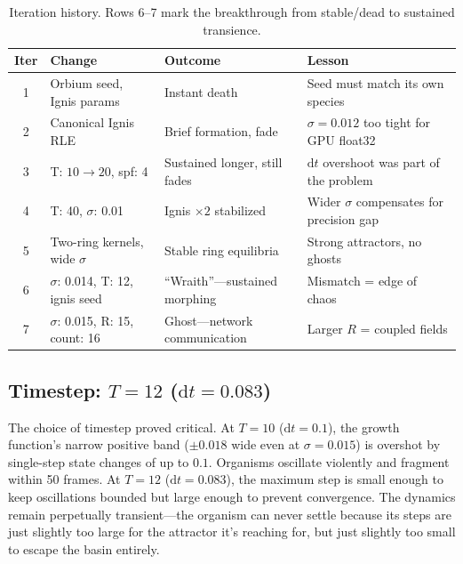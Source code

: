 \documentclass[11pt,a4paper]{article}
\begin{document}
\begin{table}[h]
\centering
\small
\setlength{\tabcolsep}{6pt}
\renewcommand{\arraystretch}{1.2}
\begin{tabularx}{\linewidth}{@{}c l X X@{}}
\toprule
\textbf{Iter} & \textbf{Change} & \textbf{Outcome} & \textbf{Lesson} \\
\midrule
1 & Orbium seed, Ignis params       & Instant death                & Seed must match its own species \\
2 & Canonical Ignis RLE             & Brief formation, fade        & $\sigma{=}0.012$ too tight for GPU float32 \\
3 & T: $10\to 20$, spf: 4           & Sustained longer, still fades & $\mathrm{d}t$ overshoot was part of the problem \\
4 & T: 40, $\sigma$: 0.01           & Ignis $\times 2$ stabilized   & Wider $\sigma$ compensates for precision gap \\
5 & Two-ring kernels, wide $\sigma$ & Stable ring equilibria        & Strong attractors, no ghosts \\
6 & $\sigma$: 0.014, T: 12, ignis seed & ``Wraith''---sustained morphing & Mismatch = edge of chaos \\
7 & $\sigma$: 0.015, R: 15, count: 16 & Ghost---network communication & Larger $R$ = coupled fields \\
\bottomrule
\end{tabularx}
\caption{Iteration history. Rows 6--7 mark the breakthrough from
stable/dead to sustained transience.}
\label{tab:iterations}
\end{table}

\subsection{Timestep: $T = 12$ ($\mathrm{d}t = 0.083$)}

The choice of timestep proved critical. At $T = 10$ ($\mathrm{d}t = 0.1$),
the growth function's narrow positive band ($\pm 0.018$ wide even at
$\sigma = 0.015$) is overshot by single-step state changes of up to $0.1$.
Organisms oscillate violently and fragment within 50 frames. At $T = 12$
($\mathrm{d}t = 0.083$), the maximum step is small enough to keep
oscillations bounded but large enough to prevent convergence. The dynamics
remain perpetually transient---the organism can never settle because its
steps are just slightly too large for the attractor it's reaching for, but
just slightly too small to escape the basin entirely.
\end{document}
